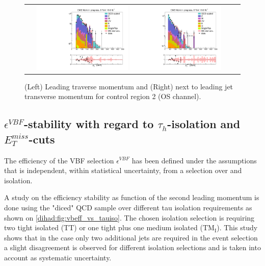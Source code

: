 \begin{figure}[tbh!]
	\centering
	\begin{tabular}{cc}
		\includegraphics[width=0.45\textwidth]{PLOTS/diTauHadLSQCDPlots/AllMCdiced/OS_CR2/OS_Central_invertedVBF_2TightIso_CR2/h_tau1pt_log.pdf}
		\includegraphics[width=0.45\textwidth]{PLOTS/diTauHadLSQCDPlots/AllMCdiced/OS_CR2/OS_Central_invertedVBF_2TightIso_CR2/h_jet2pt_log.pdf} 		
	\end{tabular}
	\caption{(Left) Leading \hadtau traverse momentum and (Right) next to leading jet transverse momentum for control region 2 (OS channel).}
	\label{fig::CR2_controlplots2}
\end{figure}

\subsection{$\epsilon^{VBF}$-stability with regard to $\tau_{h}$-isolation and $E_{T}^{miss}$-cuts}
\label{dihad:subsec:stability}


The efficiency of the VBF selection $\epsilon^{VBF}$ has been defined under the assumptions that is independent, within statistical uncertainty, from a selection over \met and \hadtau isolation.
 
 A study on the efficiency stability as function of the second leading \hadtau momentum is done using the "diced" QCD sample over different tau isolation requirements as shown on \autoref{dihad:fig:vbeff_vs_tauiso}. The chosen \hadtau isolation selection is requiring two tight isolated \hadtau (TT) or one tight plus one medium isolated \hadtau ($\text{TM}_{\text{I}}$). This study shows that in the case only two additional jets are required in the event selection a slight disagreement is observed for different isolation selections and is taken into account as systematic uncertainty.

